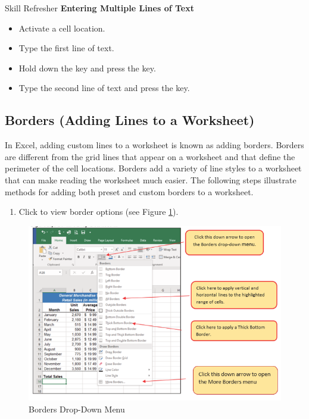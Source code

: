 \begin{center}
	\begin{sklbox}{Skill Refresher}
		\textbf{Entering Multiple Lines of Text}
		\\
		\begin{itemize}
			\setlength{\itemsep}{0pt}
			\setlength{\parskip}{0pt}
			\setlength{\parsep}{0pt}
			
			\item Activate a cell location.
			\item Type the first line of text.
			\item Hold down the  key and press the  key.
			\item Type the second line of text and press the  key.
			
		\end{itemize}
	\end{sklbox}
\end{center}

\subsection{Borders (Adding Lines to a Worksheet)}

In Excel, adding custom lines to a worksheet is known as adding borders. Borders are different from the grid lines that appear on a worksheet and that define the perimeter of the cell locations. Borders add a variety of line styles to a worksheet that can make reading the worksheet much easier. The following steps illustrate methods for adding both preset and custom borders to a worksheet.

\begin{enumerate}
	\item Click  to view border options (see Figure \ref{01:fig42}).
\end{enumerate}

\begin{figure}[H]
	\centering
	\includegraphics[width=\maxwidth{.95\linewidth}]{gfx/ch01_fig42}
	\caption{Borders Drop-Down Menu}
	\label{01:fig42}
\end{figure}

